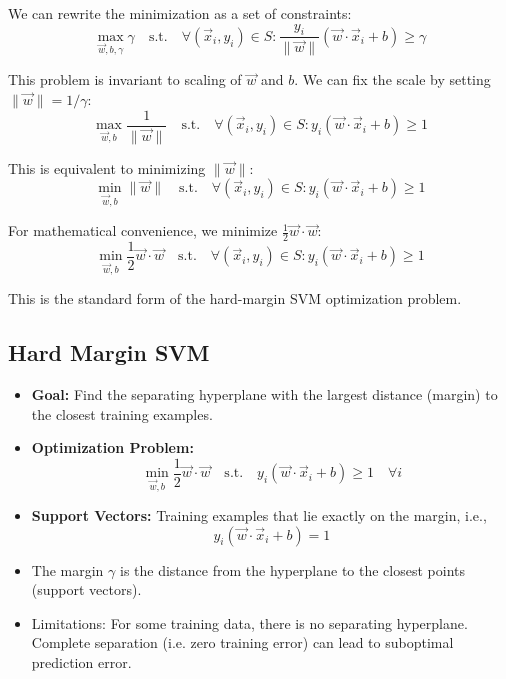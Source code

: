 We can rewrite the minimization as a set of constraints:
\[
\max_{\vec{w}, b, \gamma} \gamma \quad \text{s.t.} \quad \forall (\vec{x}_i, y_i) \in S: \frac{y_i}{\|\vec{w}\|} \left( \vec{w} \cdot \vec{x}_i + b \right) \geq \gamma
\]

This problem is invariant to scaling of $\vec{w}$ and $b$. We can fix the scale by setting $\|\vec{w}\| = 1/\gamma$:
\[
\max_{\vec{w}, b} \frac{1}{\|\vec{w}\|} \quad \text{s.t.} \quad \forall (\vec{x}_i, y_i) \in S: y_i \left( \vec{w} \cdot \vec{x}_i + b \right) \geq 1
\]

This is equivalent to minimizing $\|\vec{w}\|$:
\[
\min_{\vec{w}, b} \|\vec{w}\| \quad \text{s.t.} \quad \forall (\vec{x}_i, y_i) \in S: y_i \left( \vec{w} \cdot \vec{x}_i + b \right) \geq 1
\]

For mathematical convenience, we minimize $\frac{1}{2} \vec{w} \cdot \vec{w}$:
\[
\min_{\vec{w}, b} \frac{1}{2} \vec{w} \cdot \vec{w} \quad \text{s.t.} \quad \forall (\vec{x}_i, y_i) \in S: y_i \left( \vec{w} \cdot \vec{x}_i + b \right) \geq 1
\]

This is the standard form of the hard-margin SVM optimization problem.

\subsection{Hard Margin SVM}

\begin{itemize}
    \item \textbf{Goal:} Find the separating hyperplane with the largest distance (margin) to the closest training examples.
    \item \textbf{Optimization Problem:}
    \[
        \min_{\vec{w}, b} \frac{1}{2} \vec{w} \cdot \vec{w} \quad \text{s.t.} \quad y_i(\vec{w} \cdot \vec{x}_i + b) \geq 1 \quad \forall i
    \]
    \item \textbf{Support Vectors:} Training examples that lie exactly on the margin, i.e.,
    \[
        y_i(\vec{w} \cdot \vec{x}_i + b) = 1
    \]
    \item The margin $\gamma$ is the distance from the hyperplane to the closest points (support vectors).
    \item Limitations: For some training data, there is no separating hyperplane. Complete separation (i.e. zero training error) can lead to suboptimal prediction error.
\end{itemize}

